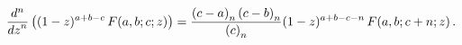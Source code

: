\[\frac{{d}^{n}}{{dz}^{n}}\left((1-z)^{a+b-c}\mathop{F\/}\nolimits\!\left(a,b;c;%
z\right)\right)=\frac{\left(c-a\right)_{n}\left(c-b\right)_{n}}{\left(c\right)%
_{n}}(1-z)^{a+b-c-n}\*\mathop{F\/}\nolimits\!\left(a,b;c+n;z\right).\]